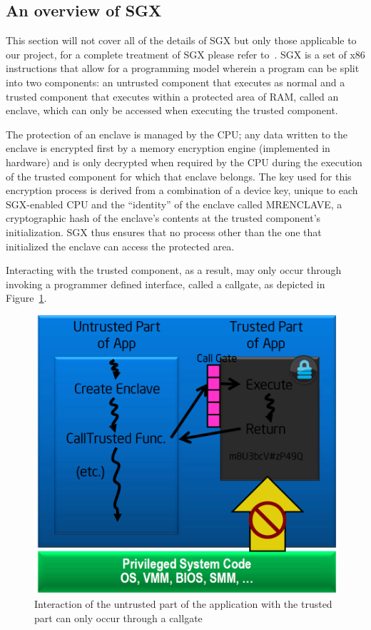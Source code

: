 \documentclass[../main.tex]{subfiles}
\begin{document}
	
\subsection{An overview of \Intel SGX} 
This section will not cover all of the details of SGX but only those applicable to our project, for a complete treatment
of SGX please refer to~\cite{IntelCorporation2010}. \Intel SGX is a set of x86 instructions that allow for a programming model wherein a
program can be split into two components: an untrusted component that executes as normal and a trusted component that executes
within a protected area of RAM, called an enclave, which can only be accessed when executing the trusted component. 

The protection of an enclave is managed by the CPU; any data written to the enclave is encrypted first by a memory encryption engine (implemented in hardware) 
and is only decrypted when required by the CPU during the execution of the trusted component for which that enclave belongs. The key used for this encryption process
is derived from a combination of a device key, unique to each SGX-enabled CPU and the ``identity'' of the enclave called MRENCLAVE, a cryptographic hash of the enclave's contents
at the trusted component's initialization. SGX thus ensures that no process other than the one that initialized the enclave can access the protected area. 

Interacting with the trusted component, as a result, may only occur through invoking a programmer defined interface, called a callgate, as depicted in Figure~\ref{fig:sgxhighlevel}.

\begin{figure}[H]
	\centering
	\includegraphics[scale=0.25]{images/sgxhighlevel.png}
	\caption{Interaction of the untrusted part of the application with the trusted part can only occur through a callgate}
	\label{fig:sgxhighlevel}
\end{figure}
\end{document}
